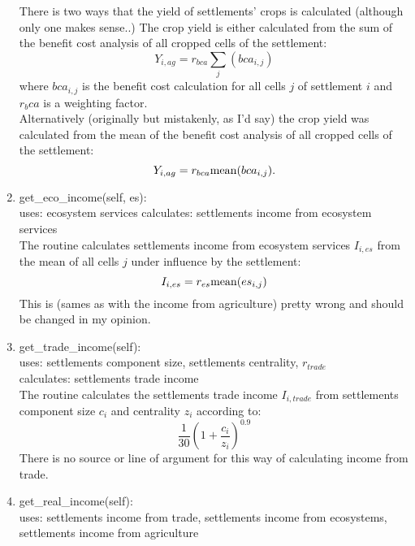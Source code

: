 \begin{enumerate}
		There is two ways that the yield of settlements' crops is calculated (although only one makes sense..)
		The crop yield is either calculated from the sum of the benefit cost analysis of all cropped cells of the settlement:
		\begin{equation}
			Y_{i, ag} = r_{bca}\sum_j (bca_{i,j})
			\label{crop_yield}
		\end{equation}
		where $bca_{i,j}$ is the benefit cost calculation for all cells $j$ of settlement $i$ and $r_bca$ is a weighting factor. \\
		Alternatively (originally but mistakenly, as I'd say) the crop yield was calculated from the mean of the benefit cost analysis of all cropped cells of the settlement:
		\begin{equation}
			Y_{i, ag} = r_{bca}{\rm mean}(bca_{i, j}).
			\label{crop_yield_mean}
		\end{equation}
	\item get_eco_income(self, es):\\
		uses: ecosystem services
		calculates: settlements income from ecosystem services\\
		The routine calculates settlements income from ecosystem services $I_{i, es}$ from the mean of all cells $j$ under influence by the settlement:
		\begin{equation}
			I_{i, es} = r_{es}{\rm mean}(es_{i,j})
			\label{ecosystem_income}
		\end{equation}
		This is (sames as with the income from agriculture) pretty wrong and should be changed in my opinion.
	\item get_trade_income(self): \\
		uses: settlements component size, settlements centrality, $r_{trade}$\\
		calculates: settlements trade income\\
		The routine calculates the settlements trade income $I_{i,trade}$ from settlements component size $c_i$ and centrality $z_i$ according to:
		\begin{equation}
			\frac{1}{30}\left( 1 + \frac{c_i}{z_i} \right)^{0.9}
			\label{trade_income}
		\end{equation}
		There is no source or line of argument for this way of calculating income from trade.
	\item get_real_income(self):\\
		uses: settlements income from trade, settlements income from ecosystems, settlements income from agriculture\\

\end{enumerate}
